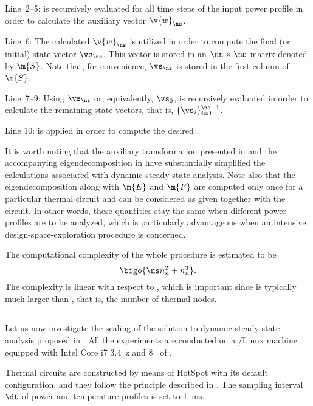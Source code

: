 Line~2--5:  is recursively
evaluated for all time steps of the input power profile \mp in order to
calculate the auxiliary vector $\v{w}_\ns$.

Line~6: The calculated $\v{w}_\ns$ is utilized in order to compute the final (or
initial) state vector $\vs_\ns$. This vector is stored in an $\nn \times \ns$
matrix denoted by $\m{S}$. Note that, for convenience, $\vs_\ns$ is stored in
the first column of $\m{S}$.

Line~7--9: Using $\vs_\ns$ or, equivalently, $\vs_0$,
 is recursively evaluated in order to
calculate the remaining state vectors, that is, $\{ \vs_i \}_{i = 1}^{\ns - 1}$.

Line 10:  is applied in order to compute the desired
\mq.

It is worth noting that the auxiliary transformation presented in
 and the accompanying eigendecomposition in
 have substantially simplified the calculations
associated with dynamic steady-state analysis. Note also that the
eigendecomposition along with $\m{E}$ and $\m{F}$ are computed only once for a
particular thermal  circuit and can be considered as given together with
the circuit. In other words, these quantities stay the same when different power
profiles are to be analyzed, which is particularly advantageous when an
intensive design-space-exploration procedure is concerned.

The computational complexity of the whole procedure is estimated to be
\[
  \bigo{\ns n_n^2 + n_n^3}.
\]
The complexity is linear with respect to \ns, which is important since \ns is
typically much larger than \nn, that is, the number of thermal nodes.

\subsection{\resultstitle}

Let us now investigate the scaling of the solution to dynamic steady-state
analysis proposed in . All the experiments
are conducted on a /Linux machine equipped with Intel Core i7
3.4~z and 8~ of .

Thermal  circuits are constructed by means of HotSpot \cite{skadron2003}
with its default configuration, and they follow the principle described in
. The sampling interval $\dt$ of power and temperature
profiles is set to 1~ms.

